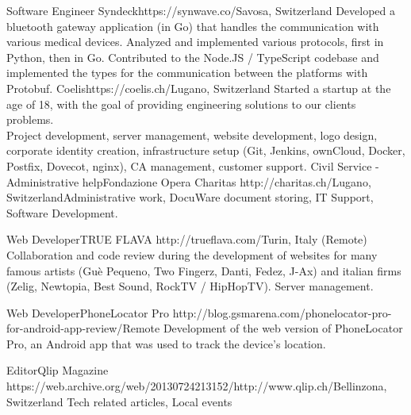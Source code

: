 \begin{CV}
        {Software Engineer}
        {Syndeck}{https://synwave.co/}{Savosa, Switzerland}
        {Developed a bluetooth gateway application (in Go) that handles the communication with various
        medical devices. Analyzed and implemented various protocols, first in Python, then in Go.
        Contributed to the Node.JS / TypeScript codebase and implemented the types for the communication 
        between the platforms with Protobuf.}
        {Coelis}{https://coelis.ch/}{Lugano, Switzerland}
        {Started a startup at the age of 18, with the goal of providing engineering solutions to our clients problems.\\
        Project development, server management, website development, logo design, 
        corporate identity creation, infrastructure setup (Git, Jenkins, ownCloud, Docker, Postfix, Dovecot, nginx),
        CA management, customer support.}
    {Civil Service - Administrative help}{Fondazione Opera Charitas}
    {http://charitas.ch/}{Lugano, Switzerland}{Administrative work, DocuWare document storing, IT Support, Software Development.}

    {Web Developer}{TRUE FLAVA}
    {http://trueflava.com/}{Turin, Italy (Remote)}{
        Collaboration and code review during the development of websites for many famous artists (Guè Pequeno,
        Two Fingerz, Danti, Fedez, J-Ax) and italian firms (Zelig, Newtopia, Best Sound, RockTV / HipHopTV). 
        Server management.
    }

    {Web Developer}{PhoneLocator Pro}
    {http://blog.gsmarena.com/phonelocator-pro-for-android-app-review/}{Remote}
    {Development of the web version of PhoneLocator Pro, an Android app that was used 
    to track the device's location.}

    {Editor}{Qlip Magazine}
    {https://web.archive.org/web/20130724213152/http://www.qlip.ch/}{Bellinzona, Switzerland}
    {Tech related articles, Local events}
\end{CV}